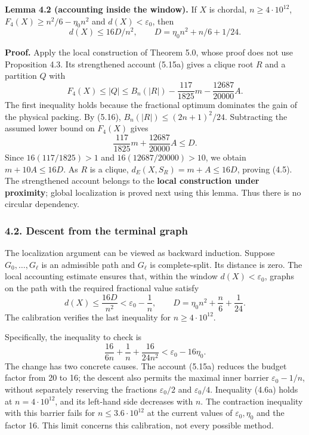 \documentclass[english,11pt,a4paper]{article}
\begin{document}

\textbf{Lemma 4.2 (accounting inside the window).} If \(X\) is chordal, \(n\ge4\cdot10^{12}\), \(F_4(X)\ge n^2/6-\eta_0n^2\) and \(d(X)<\varepsilon_0\), then \[
d(X)\le16D/n^2,\qquad D=\eta_0n^2+n/6+1/24.
\tag{4.5}
\]

\textbf{Proof.} Apply the local construction of Theorem 5.0, whose proof does not use Proposition 4.3. Its strengthened account (5.15a) gives a clique root \(R\) and a partition \(Q\) with \[
F_4(X)\le |Q|\le B_n(|R|)-\frac{117}{1825}m-\frac{12687}{20000}A.
\] The first inequality holds because the fractional optimum dominates the gain of the physical packing. By (5.16), \(B_n(|R|)\le(2n+1)^2/24\). Subtracting the assumed lower bound on \(F_4(X)\) gives \[
\frac{117}{1825}m+\frac{12687}{20000}A\le D.
\] Since \(16(117/1825)>1\) and \(16(12687/20000)>10\), we obtain \(m+10A\le16D\). As \(R\) is a clique, \(d_E(X,S_R)=m+A\le16D\), proving (4.5). The strengthened account belongs to the \textbf{local construction under proximity}; global localization is proved next using this lemma. Thus there is no circular dependency.

\subsubsection{4.2. Descent from the terminal graph}\label{descent-from-the-terminal-graph}

The localization argument can be viewed as backward induction. Suppose \(G_0,\ldots,G_\ell\) is an admissible path and \(G_\ell\) is complete-split. Its distance is zero. The local accounting estimate ensures that, within the window \(d(X)<\varepsilon_0\), graphs on the path with the required fractional value satisfy \[
d(X)\le\frac{16D}{n^2}<\varepsilon_0-\frac1n,\qquad
D=\eta_0n^2+\frac n6+\frac1{24}.
\tag{4.6}
\] The calibration verifies the last inequality for \(n\ge4\cdot10^{12}\).

Specifically, the inequality to check is \[
\frac{16}{6n}+\frac1n+\frac{16}{24n^2}
<\varepsilon_0-16\eta_0.
\tag{4.6a}
\] The change has two concrete causes. The account (5.15a) reduces the budget factor from 20 to 16; the descent also permits the maximal inner barrier \(\varepsilon_0-1/n\), without separately reserving the fractions \(\varepsilon_0/2\) and \(\varepsilon_0/4\). Inequality (4.6a) holds at \(n=4\cdot10^{12}\), and its left-hand side decreases with \(n\). The contraction inequality with this barrier fails for \(n\le3.6\cdot10^{12}\) at the current values of \(\varepsilon_0,\eta_0\) and the factor 16. This limit concerns this calibration, not every possible method.
\end{document}
